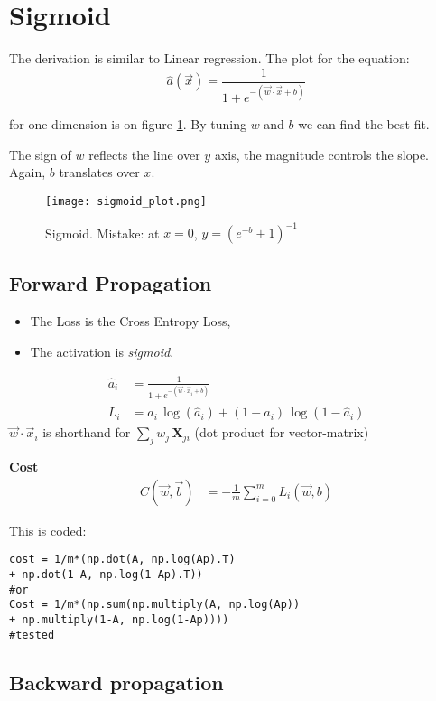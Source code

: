 \section{Sigmoid}
The derivation is similar to Linear regression. The plot for the equation:
\[
  \hat{a}(\vec{x})= \frac{1}{1+e^{-(\vec{w}\cdot{}\vec{x}+b)}}
\]

for one dimension is on figure \ref{fig:sigmoid}. By tuning $w$ and $b$  we can find the best fit. 

The sign of $w$ reflects the line over $y$ axis, the magnitude controls the slope. Again, $b$ translates over $x$.

\begin{figure}[h]
 \centering
 \texttt{[image: sigmoid\_plot.png]}
  \caption{Sigmoid. Mistake: at $x=0$, $y=(e^{-b}+1)^{-1}$} \label{fig:sigmoid}
\end{figure}

\subsection{Forward Propagation}
\begin{itemize}
  \item The Loss is the Cross Entropy Loss,
  \item The activation is \textit{sigmoid}.
\end{itemize}

\begin{align}
  \hat{a}_i &= \frac{1}{1+e^{-(\vec{w}\cdot \vec{x}_i + b)}}\\
  L_i &= a_i\,\log(\hat{a}_i) + (1-a_i)\,\log(1-\hat{a}_i)
\end{align}
$\vec{w}\cdot{}\vec{x}_i$ is shorthand for $\sum_{j} w_j\,\mathbf{X}_{ji}$ (dot product for vector-matrix)

\textbf{Cost}
\begin{align*}
  C(\vec{w}, \vec{b}) &= -\frac{1}{m}\sum_{i=0}^m L_i(\vec{w}, b)
\end{align*}

This is coded:
\begin{verbatim}
cost = 1/m*(np.dot(A, np.log(Ap).T) 
+ np.dot(1-A, np.log(1-Ap).T))
#or
Cost = 1/m*(np.sum(np.multiply(A, np.log(Ap)) 
+ np.multiply(1-A, np.log(1-Ap))))
#tested
\end{verbatim}

\subsection{Backward propagation}


